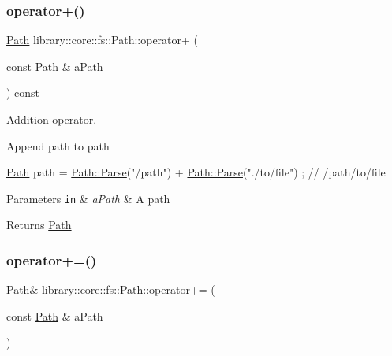 \subsubsection{\texorpdfstring{operator+()}{operator+()}}
{\footnotesize\ttfamily \hyperlink{classlibrary_1_1core_1_1fs_1_1_path}{Path} library\+::core\+::fs\+::\+Path\+::operator+ (\begin{DoxyParamCaption}\item[{const \hyperlink{classlibrary_1_1core_1_1fs_1_1_path}{Path} \&}]{a\+Path }\end{DoxyParamCaption}) const}



Addition operator. 

Append path to path


\begin{DoxyCode}
\hyperlink{classlibrary_1_1core_1_1fs_1_1_path_aaba9a8e0153813f08f78f1c3275734a4}{Path} path = \hyperlink{classlibrary_1_1core_1_1fs_1_1_path_aebf5bd3af83e0b7376616e146f3e55df}{Path::Parse}(\textcolor{stringliteral}{"/path"}) + \hyperlink{classlibrary_1_1core_1_1fs_1_1_path_aebf5bd3af83e0b7376616e146f3e55df}{Path::Parse}(\textcolor{stringliteral}{"./to/file"}) ; \textcolor{comment}{// /path/to/file}
\end{DoxyCode}



\begin{DoxyParams}[1]{Parameters}
\mbox{\tt in}  & {\em a\+Path} & A path \\
\hline
\end{DoxyParams}
\begin{DoxyReturn}{Returns}
\hyperlink{classlibrary_1_1core_1_1fs_1_1_path}{Path} 
\end{DoxyReturn}
\mbox{\label{classlibrary_1_1core_1_1fs_1_1_path_a3fae713dbf257fdcec2fdb2ec6c27256}} 
\subsubsection{\texorpdfstring{operator+=()}{operator+=()}}
{\footnotesize\ttfamily \hyperlink{classlibrary_1_1core_1_1fs_1_1_path}{Path}\& library\+::core\+::fs\+::\+Path\+::operator+= (\begin{DoxyParamCaption}\item[{const \hyperlink{classlibrary_1_1core_1_1fs_1_1_path}{Path} \&}]{a\+Path }\end{DoxyParamCaption})}



